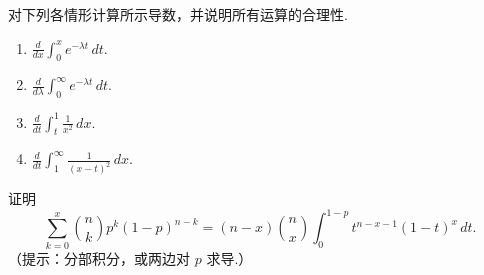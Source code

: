 \begin{exercise}\label{exercise:2.39}
对下列各情形计算所示导数，并说明所有运算的合理性.
\begin{enumerate}
\item[(a)] $\displaystyle\frac d{dx}\int_0^x e^{-\lambda t}\,dt$.
\item[(b)] $\displaystyle\frac d{d\lambda}\int_0^\infty e^{-\lambda t}\,dt$.
\item[(c)] $\displaystyle\frac d{dt}\int_t^1\frac1{x^2}\,dx$.
\item[(d)] $\displaystyle\frac d{dt}\int_1^\infty\frac1{(x-t)^2}\,dx$.
\end{enumerate}
\end{exercise}
\begin{exercise}\label{exercise:2.40}
证明
$$\sum_{k=0}^x\binom nk p^k(1-p)^{n-k}
=(n-x)\binom nx\int_0^{1-p}t^{n-x-1}(1-t)^x\,dt.$$
（提示：分部积分，或两边对 $p$ 求导.）
\end{exercise}
